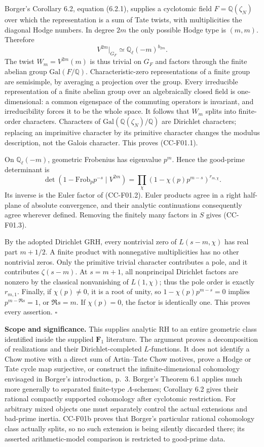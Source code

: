 Borger's Corollary 6.2, equation (6.2.1), supplies a cyclotomic field
\(F=\mathbb Q(\zeta_N)\) over which the representation is a sum of Tate
twists, with multiplicities the diagonal Hodge numbers. In degree \(2m\)
the only possible Hodge type is \((m,m)\). Therefore \[
 V^{2m}|_{G_F}\simeq\mathbb Q_\ell(-m)^{b_{2m}}.
\] The twist \(W_m=V^{2m}(m)\) is thus trivial on \(G_F\) and factors
through the finite abelian group \(\mathrm{Gal}(F/\mathbb Q)\).
Characteristic-zero representations of a finite group are semisimple, by
averaging a projection over the group. Every irreducible representation
of a finite abelian group over an algebraically closed field is
one-dimensional: a common eigenspace of the commuting operators is
invariant, and irreducibility forces it to be the whole space. It
follows that \(W_m\) splits into finite-order characters. Characters of
\(\mathrm{Gal}(\mathbb Q(\zeta_N)/\mathbb Q)\) are Dirichlet characters;
replacing an imprimitive character by its primitive character changes
the modulus description, not the Galois character. This proves
(CC-F01.1).

On \(\mathbb Q_\ell(-m)\), geometric Frobenius has eigenvalue \(p^m\).
Hence the good-prime determinant is \[
 \det(1-\mathrm{Frob}_p p^{-s}\mid V^{2m})
   =\prod_\chi(1-\chi(p)p^{m-s})^{r_{m,\chi}}.
\] Its inverse is the Euler factor of (CC-F01.2). Euler products agree
in a right half-plane of absolute convergence, and their analytic
continuations consequently agree wherever defined. Removing the finitely
many factors in \(S\) gives (CC-F01.3).

By the adopted Dirichlet GRH, every nontrivial zero of \(L(s-m,\chi)\)
has real part \(m+1/2\). A finite product with nonnegative
multiplicities has no other nontrivial zeros. Only the primitive trivial
character contributes a pole, and it contributes \(\zeta(s-m)\). At
\(s=m+1\), all nonprincipal Dirichlet factors are nonzero by the
classical nonvanishing of \(L(1,\chi)\); thus the pole order is exactly
\(r_{m,1}\). Finally, if \(\chi(p)\ne0\), it is a root of unity, so
\(1-\chi(p)p^{m-s}=0\) implies \(p^{m-\Re s}=1\), or \(\Re s=m\). If
\(\chi(p)=0\), the factor is identically one. This proves every
assertion. \(\square\)

\textbf{Scope and significance.} This supplies analytic RH to an entire
geometric class identified inside the supplied \(\mathbf F_1\)
literature. The argument proves a decomposition of realizations and
their Dirichlet-completed \(L\)-functions. It does not identify a Chow
motive with a direct sum of Artin--Tate Chow motives, prove a Hodge or
Tate cycle map surjective, or construct the infinite-dimensional
cohomology envisaged in Borger's introduction, p.~3. Borger's Theorem
6.1 applies much more generally to separated finite-type
\(\Lambda\)-schemes; Corollary 6.2 gives their rational compactly
supported cohomology after cyclotomic restriction. For arbitrary mixed
objects one must separately control the actual extensions and bad-prime
inertia. CC-F01b proves that Borger's particular rational cohomology
class actually splits, so no such extension is being silently discarded
there; its asserted arithmetic-model comparison is restricted to
good-prime data.

